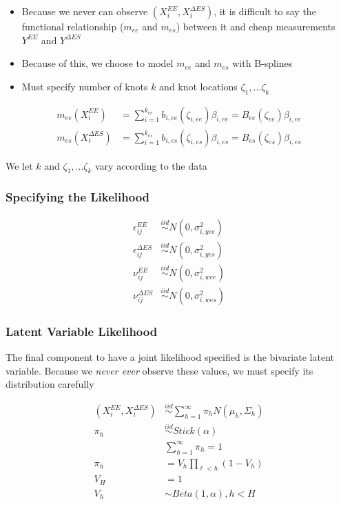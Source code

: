 \documentclass[handout]{beamer}\usepackage[]{graphicx}\usepackage[]{color}
\begin{document}
\begin{frame}
\begin{itemize}
\item
Because we never can observe $(X_i^{EE},X_i^{\Delta ES})$, it is difficult to say the functional relationship ($m_{ee}$ and $m_{es}$) between it and cheap measurements $Y^{EE}$ and $Y^{\Delta ES}$ 

\item
Because of this, we choose to model $m_{ee}$ and $m_{es}$ with B-splines
\item
Must specify number of knots $k$ and knot locations $\zeta_1,...\zeta_k$
\end{itemize}

\begin{align}
m_{ee}(X_i^{EE}) &= \sum_{i=1}^{k_{ee}} b_{i,ee}(\zeta_{i,ee}) \beta_{i,ee} = B_{ee}(\zeta_{ee}) \beta_{i,ee} \\
m_{es}(X_i^{\Delta ES}) &= \sum_{i=1}^{k_{es}} b_{i,es}(\zeta_{i,es}) \beta_{i,es} = B_{es}(\zeta_{es}) \beta_{i,es}
\end{align}

We let $k$ and $\zeta_1,...\zeta_k$ vary according to the data

\end{frame}

\begin{frame}
\frametitle{Specifying the Likelihood}

\begin{align}
\epsilon_{ij}^{EE} &\overset{iid}{\sim} N(0,\sigma_{i,yee}^2) \\
\epsilon_{ij}^{\Delta ES} &\overset{iid}{\sim} N(0,\sigma_{i,yes}^2) \\
\nu_{ij}^{EE} &\overset{iid}{\sim} N(0,\sigma_{i,wee}^2) \\
\nu_{ij}^{\Delta ES} &\overset{iid}{\sim} N(0,\sigma_{i,wes}^2) 
\end{align}

\end{frame}

\begin{frame}
\frametitle{Latent Variable Likelihood}

The final component to have a joint likelihood specified is the bivariate latent variable. Because we \emph{never ever} observe these values, we must specify its distribution carefully

\begin{align}
(X_i^{EE}, X_i^{\Delta ES}) &\overset{iid}{\sim} \sum_{h=1}^{\infty} \pi_h N(\mu_h,\Sigma_h) \\
\pi_h &\overset{iid}{\sim} Stick(\alpha) \\
 & \sum_{h=1}^{\infty} \pi_h = 1 \\
 \pi_h &= V_h \prod_{\ell <  h} (1-V_h) \\
 V_H &= 1\\
 V_h &\sim Beta(1,\alpha), h<H
\end{align}

\end{frame}
\end{document}
